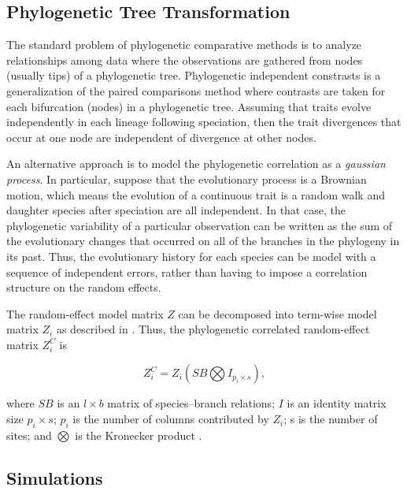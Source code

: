 \documentclass[12pt]{article}
\begin{document}
\subsection{Phylogenetic Tree Transformation}
The standard problem of phylogenetic comparative methods is to analyze relationships among data where the observations are gathered from nodes (usually tips) of a phylogenetic tree.
Phylogenetic independent constrasts is a generalization of the paired comparisons method where contrasts are taken for each bifurcation (nodes) in a phylogenetic tree. 
Assuming that traits evolve independently in each lineage following speciation, then the trait divergences that occur at one node are independent of divergence at other nodes.  

An alternative approach is to model the phylogenetic correlation as a \textit{gaussian process}. 
In particular, suppose that the evolutionary process is a Brownian motion, which means the evolution of a continuous trait is a random walk and daughter species after speciation are all independent.  
In that case, the phylogenetic variability of a particular observation can be written as the sum of the evolutionary changes that occurred on all of the branches in the phylogeny in its past. 
Thus, the evolutionary history for each species can be model with a sequence of independent errors, rather than having to impose a correlation structure on the random effects. 


The random-effect model matrix $Z$ can be decomposed into term-wise model matrix $Z_{i}$ as described in .
Thus, the phylogenetic correlated random-effect matrix $Z^{C}_{i}$ is

\begin{equation}
Z^{C}_{i} = Z_{i}(SB \bigotimes I_{p_i \times s}) ,
\end{equation}


where $SB$ is an $l \times b$ matrix of species--branch relations; $I$ is an identity matrix size $p_i \times s$; $p_i$ is the number of columns contributed by $Z_i$; s is the number of sites; and  $\bigotimes$ is the Kronecker product .  



\subsection{Simulations}
\end{document}
